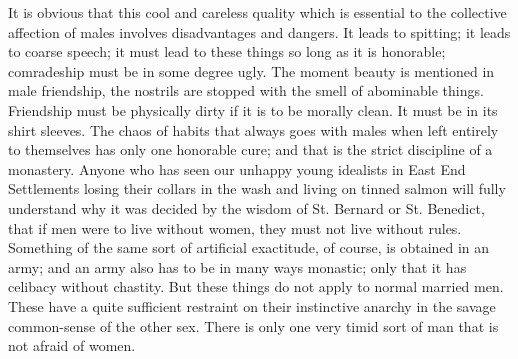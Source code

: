 \documentclass{book}
\begin{document}
It is obvious that this cool and careless quality which is essential to the collective affection of males involves disadvantages and dangers. It leads to spitting; it leads to coarse speech; it must lead to these things so long as it is honorable; comradeship must be in some degree ugly. The moment beauty is mentioned in male friendship, the nostrils are stopped with the smell of abominable things. Friendship must be physically dirty if it is to be morally clean. It must be in its shirt sleeves. The chaos of habits that always goes with males when left entirely to themselves has only one honorable cure; and that is the strict discipline of a monastery. Anyone who has seen our unhappy young idealists in East End Settlements losing their collars in the wash and living on tinned salmon will fully understand why it was decided by the wisdom of St. Bernard or St. Benedict, that if men were to live without women, they must not live without rules. Something of the same sort of artificial exactitude, of course, is obtained in an army; and an army also has to be in many ways monastic; only that it has celibacy without chastity. But these things do not apply to normal married men. These have a quite sufficient restraint on their instinctive anarchy in the savage common-sense of the other sex. There is only one very timid sort of man that is not afraid of women.
\end{document}

